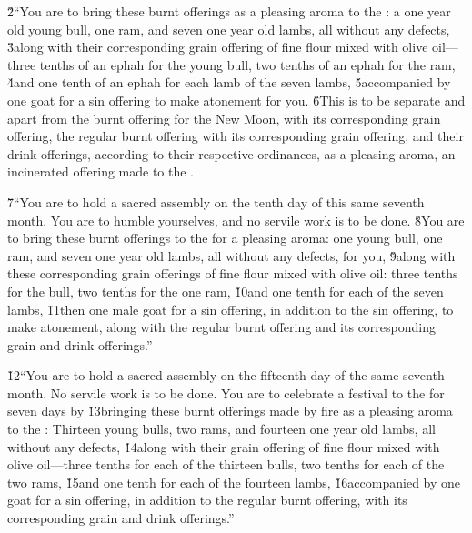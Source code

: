 \v{2}``You are to bring these burnt offerings as a pleasing aroma to the : a one year old young bull, one ram, and seven one year old lambs, all without any defects, \v{3}along with their corresponding grain offering of fine flour mixed with olive oil---three tenths of an ephah for the young bull, two tenths of an ephah for the ram, \v{4}and one tenth of an ephah for each lamb of the seven lambs, \v{5}accompanied by one goat for a sin offering to make atonement for you. \v{6}This is to be separate and apart from the burnt offering for the New Moon, with its corresponding grain offering, the regular burnt offering with its corresponding grain offering, and their drink offerings, according to their respective ordinances, as a pleasing aroma, an incinerated offering made to the .

\v{7}``You are to hold a sacred assembly on the tenth day of this same seventh month. You are to humble yourselves, and no servile work is to be done. \v{8}You are to bring these burnt offerings to the  for a pleasing aroma: one young bull, one ram, and seven one year old lambs, all without any defects, for you, \v{9}along with these corresponding grain offerings of fine flour mixed with olive oil: three tenths for the bull, two tenths for the one ram, \v{10}and one tenth for each of the seven lambs, \v{11}then one male goat for a sin offering, in addition to the sin offering, to make atonement, along with the regular burnt offering and its corresponding grain and drink offerings.''

\v{12}``You are to hold a sacred assembly on the fifteenth day of the same seventh month. No servile work is to be done. You are to celebrate a festival to the  for seven days by \v{13}bringing these burnt offerings made by fire as a pleasing aroma to the : Thirteen young bulls, two rams, and fourteen one year old lambs, all without any defects, \v{14}along with their grain offering of fine flour mixed with olive oil---three tenths for each of the thirteen bulls, two tenths for each of the two rams, \v{15}and one tenth for each of the fourteen lambs, \v{16}accompanied by one goat for a sin offering, in addition to the regular burnt offering, with its corresponding grain and drink offerings.''

